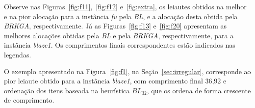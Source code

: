 \documentclass{article}
\begin{document}
\vspace{15pt}


Observe nas Figuras~\ref{fig:f11},~\ref{fig:f12} e~\ref{fig:extra}, os leiautes obtidos na melhor e na pior alocação para a instância {\it fu} pela {\it BL}, e a alocação desta obtida pela {\it BRKGA}, respectivamente. Já as Figuras~\ref{fig:f13} e~\ref{fig:f20} apresentam as melhores alocações obtidas pela {\it BL} e pela {\it BRKGA}, respectivamente, para a instância {\it blaze1}. Os comprimentos finais correspondentes estão indicados nas legendas.

O exemplo apresentado na Figura~\ref{fig:f1}, na Seção~\ref{sec:irregular}, corresponde ao pior leiaute obtido para a instância {\it blaze1}, com comprimento final 36,92 e ordenação dos itens baseada na heurística $BL_{32}$, que os ordena de forma crescente de comprimento.
\end{document}
